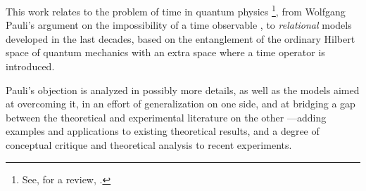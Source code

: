 This work relates to the problem of time in quantum physics%
\footnote{
  See, for a review, \cite{TQM1, TQM2}.
},
from Wolfgang Pauli's argument
on the impossibility of a time observable \parencite{PauliFootnote},
to \emph{relational} models developed in the last decades,
based
on the entanglement of the ordinary Hilbert space of quantum mechanics
with an extra space where a time operator is introduced.

Pauli's objection is analyzed in possibly more details, as well as the models
aimed at overcoming it, in an effort of generalization on one side,
and at bridging a gap between the theoretical
and experimental literature on the other
---adding examples and applications to existing theoretical results,
and a degree of conceptual critique and theoretical analysis
to recent experiments.
